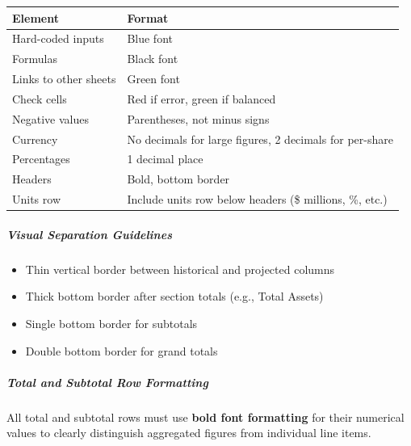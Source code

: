 \documentclass[11pt]{article}
\begin{document}
\begingroup
\small
\setlength{\tabcolsep}{2pt}
\begin{longtable}{>{\RaggedRight\arraybackslash\hspace{0pt}}p{}>{\RaggedRight\arraybackslash\hspace{0pt}}p{}}
\toprule
{} \textbf{Element} & \textbf{Format} \\
\midrule
{} Hard-coded inputs & Blue font \\
{} Formulas & Black font \\
{} Links to other sheets & Green font \\
{} Check cells & Red if error, green if balanced \\
{} Negative values & Parentheses, not minus signs \\
{} Currency & No decimals for large figures, 2 decimals for per-share \\
{} Percentages & 1 decimal place \\
{} Headers & Bold, bottom border \\
{} Units row & Include units row below headers (\$ millions, \%, etc.) \\
\bottomrule
\end{longtable}
\endgroup

\subparagraph{Visual Separation Guidelines}\mbox{}\par

\begin{itemize}[leftmargin=*,itemsep=2pt,topsep=2pt]
\item {} Thin vertical border between historical and projected columns
\item {} Thick bottom border after section totals (e.g., Total Assets)
\item {} Single bottom border for subtotals
\item {} Double bottom border for grand totals
\end{itemize}

\subparagraph{Total and Subtotal Row Formatting}\mbox{}\par

All total and subtotal rows must use \textbf{bold font formatting} for their numerical values to clearly distinguish aggregated figures from individual line items.
\end{document}
